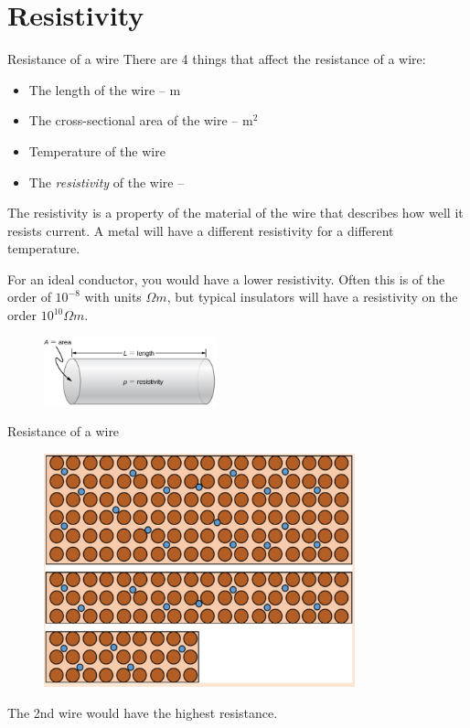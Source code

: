 \documentclass[../Main.tex]{subfiles}
\begin{document}
\author{Resistivity} %
\date{Year 1 Topic 13} %

\section{Resistivity} %

\begin{frame}{Resistance of a wire}
    There are 4 things that affect the resistance of a wire:
    \begin{itemize}
        \item The length of the wire -- m
        \item The cross-sectional area of the wire -- m$^2$
        \item Temperature of the wire
        \item The \emph{resistivity} of the wire -- 
    \end{itemize} \pause
    
    The resistivity is a property of the material of the wire that describes how well it resists current. A metal will have a different resistivity for a different temperature. 
    
    \begin{multicols}{2}
    For an ideal conductor, you would have a lower resistivity. Often this is of the order of $10^{-8}$ with units $\Omega m$, but typical insulators will have a resistivity on the order $10^{10} \Omega m$.
    \columnbreak
    \begin{figure}
        \centering
        \includegraphics[width=5cm]{Electricity_Images/resistivity.jpg}
    \end{figure}
    \end{multicols}
    \end{frame}

\begin{frame}{Resistance of a wire}
    \begin{figure}
        \centering
        \includegraphics[width=9cm]{Electricity_Images/different_wires.jpg}
    \end{figure} \pause
    The 2nd wire would have the highest resistance.
    
\end{frame}
\end{document}
